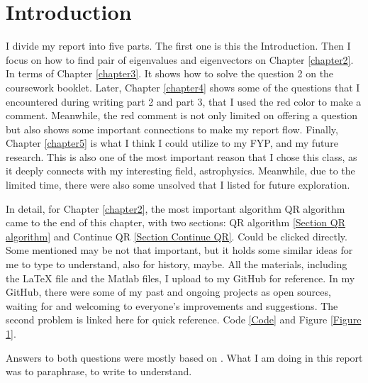 \chapter{Introduction}

I divide my report into five parts. The first one is this the Introduction. Then I focus on how to find pair of eigenvalues and eigenvectors on Chapter \ref{chapter2}. In terms of Chapter \ref{chapter3}. It shows how to solve the question 2 on the coursework booklet. Later, Chapter \ref{chapter4} shows some of the questions that I encountered during writing part 2 and part 3, that I used the red color to make a comment. Meanwhile, the red comment is not only limited on offering a question but also shows some important connections to make my report flow. Finally, Chapter \ref{chapter5} is what I think I could utilize to my FYP, and my future research. This is also one of the most important reason that I chose this class, as it deeply connects with my interesting field, astrophysics. Meanwhile, due to the limited time, there were also some unsolved that I listed for future exploration.

In detail, for Chapter \ref{chapter2}, the most important algorithm QR algorithm came to the end of this chapter, with two sections: QR algorithm \ref{Section QR algorithm} and Continue QR \ref{Section Continue QR}. Could be clicked directly. Some mentioned may be not that important, but it holds some similar ideas for me to type to understand, also for history, maybe. All the materials, including the LaTeX file and the Matlab files, I upload to my GitHub for reference. In my GitHub, there were some of my past and ongoing projects as open sources, waiting for and welcoming to everyone's improvements and suggestions. The second problem is linked here for quick reference. Code \ref{Code} and Figure \ref{Figure 1}.

Answers to both questions were mostly based on \cite{arbenz2012lecture}. What I am doing in this report was to paraphrase, to write to understand.